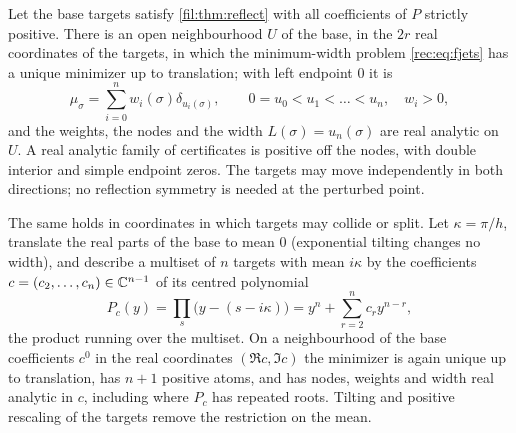 \begin{theorem}\label{fil:thm:perturb}
Let the base targets satisfy \cref{fil:thm:reflect} with all coefficients of $P$ strictly positive.
There is an open neighbourhood $U$ of the base, in the $2r$ real coordinates of the targets, in which
the minimum-width problem \eqref{rec:eq:fjets} has a unique minimizer up to translation; with left
endpoint $0$ it is
\[
 \mu_\sigma=\sum_{i=0}^nw_i(\sigma)\delta_{u_i(\sigma)},\qquad0=u_0<u_1<\dots<u_n,\quad w_i>0,
\]
and the weights, the nodes and the width $L(\sigma)=u_n(\sigma)$ are real analytic on $U$. A real
analytic family of certificates is positive off the nodes, with double interior and simple endpoint
zeros. The targets may move independently in both directions; no reflection symmetry is needed at
the perturbed point.

The same holds in coordinates in which targets may collide or split. Let $\kappa=\pi/h$, translate the
real parts of the base to mean $0$ (exponential tilting changes no width), and describe a multiset of $n$
targets with mean $i\kappa$ by the coefficients $c=(c_2,\dots,c_n)\in\mathbb{C}^{n-1}$ of its centred polynomial
\[
 P_c(y)=\prod_{s}\bigl(y-(s-i\kappa)\bigr)=y^n+\sum_{r=2}^nc_ry^{n-r},
\]
the product running over the multiset. On a neighbourhood of the base coefficients $c^0$ in the real
coordinates $(\Re c,\Im c)$ the minimizer is again unique up to translation, has $n+1$ positive atoms,
and has nodes, weights and width real analytic in $c$, including where $P_c$ has repeated roots. Tilting
and positive rescaling of the targets remove the restriction on the mean.
\end{theorem}

